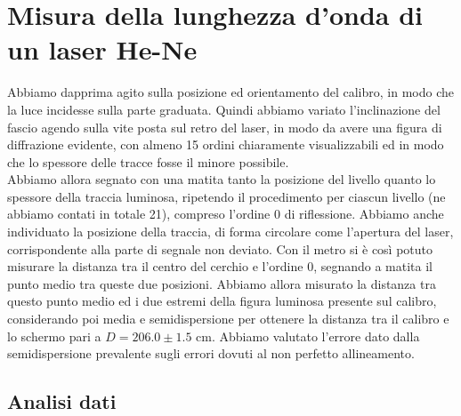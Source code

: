 \section{Misura della lunghezza d'onda di un laser He-Ne}

Abbiamo dapprima agito sulla posizione ed orientamento del calibro, in modo che la luce incidesse sulla parte graduata. Quindi abbiamo variato l'inclinazione del fascio agendo sulla vite posta sul retro del laser, in modo da avere una figura di diffrazione evidente, con almeno 15 ordini chiaramente visualizzabili ed in modo che lo spessore delle tracce fosse il minore possibile.\\
Abbiamo allora segnato con una matita tanto la posizione del livello quanto lo spessore della traccia luminosa, ripetendo il procedimento per ciascun livello (ne abbiamo contati in totale 21), compreso l'ordine 0 di riflessione. Abbiamo anche individuato la posizione della traccia, di forma circolare come l'apertura del laser, corrispondente alla parte di segnale non deviato. Con il metro si è così potuto misurare la distanza tra il centro del cerchio e l'ordine 0, segnando a matita il punto medio tra queste due posizioni. Abbiamo allora misurato la distanza tra questo punto medio ed i due estremi della figura luminosa presente sul calibro, considerando poi media e semidispersione per ottenere la distanza tra il calibro e lo schermo pari a $D = 206.0 \pm 1.5$ cm. Abbiamo valutato l'errore dato dalla semidispersione prevalente sugli errori dovuti al non perfetto allineamento.

\subsection{Analisi dati}

